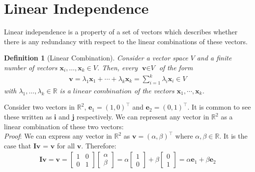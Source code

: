 \documentclass[a4paper,12pt]{book}
\newcommand{\matrx}[1]{\bm{#1}}
\newcommand{\vectr}[1]{\textbf{#1}}
\newcommand{\real}{\mathbb{R}}
\newcommand{\italic}[1]{\textit{#1}}
\newtheorem{definition}{Definition}[section]
\begin{document}
	
	
	\section{Linear Independence}
	Linear independence \cite[page 40]{mml_book} is a property of a set of vectors which describes whether there is any redundancy with respect to the linear combinations of these vectors. 
	\begin{definition}[Linear Combination]
		\normalfont	Consider a vector space $\italic{V}$ and a finite number of vectors $\vectr{x}_i,\ldots,\vectr{x}_k \in \italic{V}$. Then, every $\vectr{v} \in \italic{V}$ of the form
		\begin{align}
			\vectr{v} = \lambda_1\vectr{x}_1 + \cdots + \lambda_k\vectr{x}_k =  \sum_{i=1}^{k} \lambda_i\vectr{x}_i \in \italic{V}
		\end{align}
		with $\lambda_1,\ldots,\lambda_k \in \real$ is a $\italic{linear combination}$ of the vectors $\vectr{x}_1,\cdots,\vectr{x}_k$.
		\label{def:linear_combinations}
	\end{definition}
	Consider two vectors in $ \real^2 $, $\vectr{e}_1 = (1, 0)^{\top}$ and $\vectr{e}_2 = (0, 1)^{\top}$. It is common to see these written as $ \vectr{i} $ and $ \vectr{j} $ respectively. We can represent any vector in $ \real^2 $ as a linear combination of these two vectors: \\
	\italic{Proof}:
	We can express any vector in $ \real^{2} $ as $ \vectr{v} = (\alpha, \beta)^{\top} $ where $ \alpha, \beta \in \real $. It is the case that $ \matrx{I}\vectr{v} $ = $ \vectr{v} $ for all $ \vectr{v} $. Therefore:
	\begin{align}
		\matrx{I}\vectr{v} = \vectr{v} = \begin{bmatrix}
			1 & 0 \\
			0 & 1 
		\end{bmatrix} \begin{bmatrix}
			\alpha \\
			\beta 
		\end{bmatrix} = \alpha \begin{bmatrix}
			1 \\
			0 
		\end{bmatrix} + \beta \begin{bmatrix}
			0 \\
			1
		\end{bmatrix} = \alpha \vectr{e}_1 + \beta \vectr{e}_2
	\end{align}
\end{document}
